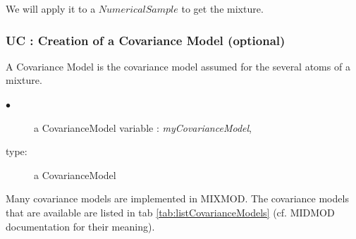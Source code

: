 We will apply it to a $NumericalSample$ to get the mixture.

\subsubsection{UC : Creation of a Covariance Model (optional)}

A Covariance Model is the covariance model assumed for the several atoms of a mixture. \\

{
  \begin{description}
  \item[$\bullet$] a CovarianceModel variable  : {\itshape myCovarianceModel},
  \item[type:] a CovarianceModel
  \end{description}
}
\espace

Many covariance models are implemented in MIXMOD. The covariance models that are available are listed in tab \ref{tab:listCovarianceModels} (cf. MIDMOD documentation for their meaning).


